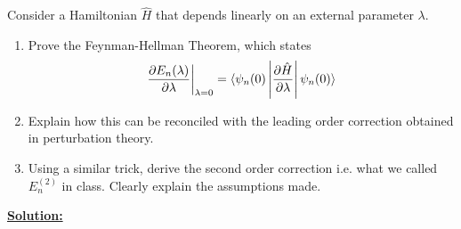 \documentclass{article}
\newcommand{\restr}[2]{{%
  \left.\kern-\nulldelimiterspace %
  #1 %
  \vphantom{\big|} %
  \right|_{#2} %
  }}
\begin{document}
Consider a Hamiltonian $\hat{H}$ that depends linearly on an external parameter $\lambda$.

\begin{enumerate}[label=(\alph*)]
  \item Prove the Feynman-Hellman Theorem, which states 
  \[ \restr{\frac{\partial E_n(\lambda)}{\partial \lambda}}{\lambda = 0} =  \langle \psi_n(0) \left| \frac{\partial \hat{H}}{\partial \lambda} \right| \psi_n(0)  \rangle \]
  \item Explain how this can be reconciled with the leading order correction obtained in perturbation theory.
  \item Using a similar trick, derive the second order correction i.e. what we called $E_n^{(2)}$ in class. Clearly explain the assumptions made.
\end{enumerate}

\vskip 0.5cm
\underline{\textbf{Solution:}} 
\end{document}
